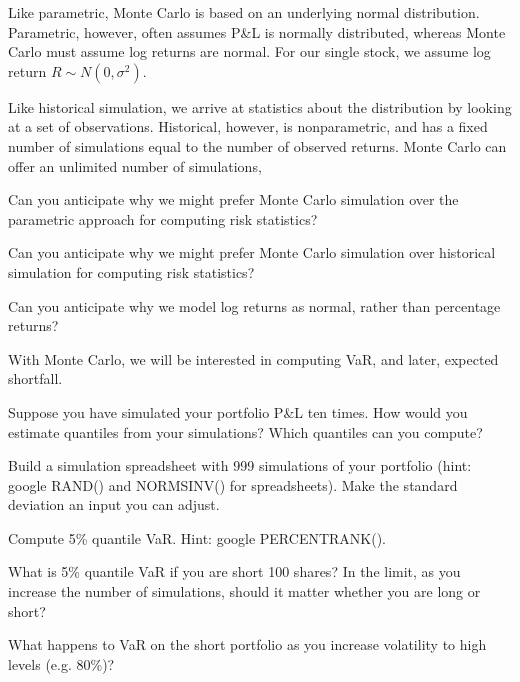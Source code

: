 \documentclass{report}
\numberwithin{problem}{chapter} %
\let\oldroblem\problem
\renewcommand{\problem}{ \oldroblem  \normalfont}
\newcommand{\pnl}{P\&L }
\begin{document}
Like parametric, Monte Carlo is based on an underlying normal distribution. Parametric, however, often assumes \pnl is normally distributed, whereas Monte Carlo must assume log returns are normal. For our single stock, we assume log return $R \sim N(0, \sigma^2)$.

Like historical simulation, we arrive at statistics about the distribution by looking at a set of observations. Historical, however, is nonparametric, and has a fixed number of simulations equal to the number of observed returns. Monte Carlo can offer an unlimited number of simulations,

\problem Can you anticipate why we might prefer Monte Carlo simulation over the parametric approach for computing risk statistics?

\problem Can you anticipate why we might prefer Monte Carlo simulation over historical simulation for computing risk statistics?

\problem Can you anticipate why we model log returns as normal, rather than percentage returns?

With Monte Carlo, we will be interested in computing VaR, and later, expected shortfall. 

\problem Suppose you have simulated your portfolio \pnl ten times. How would you estimate quantiles from your simulations? Which quantiles can you compute?

\problem Build a simulation spreadsheet with 999 simulations of your portfolio (hint: google RAND() and NORMSINV() for spreadsheets). Make the standard deviation an input you can adjust. 

\problem Compute 5\% quantile VaR. Hint: google PERCENTRANK().

\problem What is 5\% quantile VaR if you are short 100 shares? In the limit, as you increase the number of simulations, should it matter whether you are long or short? 

\problem What happens to VaR on the short portfolio as you increase volatility to high levels (e.g. 80\%)?





\end{document}
